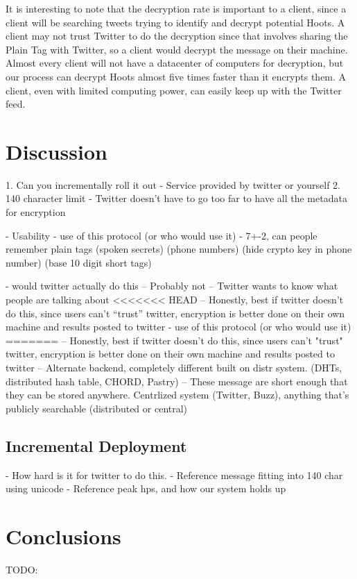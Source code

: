 \documentclass{acm_proc_article-sp}
\begin{document}
It is interesting to note that the decryption rate is important to a client, since a client will be searching tweets trying to identify and decrypt potential Hoots. A client may not trust Twitter to do the decryption since that involves sharing the Plain Tag with Twitter, so a client would decrypt the message on their machine. Almost every client will not have a datacenter of computers for decryption, but our  process can decrypt Hoots almost five times faster than it encrypts them. A client, even with limited computing power, can easily keep up with the Twitter feed.

\section{Discussion}
1. Can you incrementally roll it out
	- Service provided by twitter or yourself
2. 140 character limit
	- Twitter doesn't have to go too far to have all the metadata for encryption



- Usability
	- use of this protocol (or who would use it)
	- 7+-2, can people remember plain tags (spoken secrets) (phone numbers) (hide crypto key in phone number) (base 10 digit short tags)
	
- would twitter actually do this
	-- Probably not
	-- Twitter wants to know what people are talking about
<<<<<<< HEAD
	-- Honestly, best if twitter doesn't do this, since users can't ``trust'' twitter, encryption is better done on their own machine and results posted to twitter
- use of this protocol (or who would use it)
=======
	-- Honestly, best if twitter doesn't do this, since users can't "trust" twitter, encryption is better done on their own machine and results posted to twitter
		-- Alternate backend, completely different built on distr system. (DHTs, distributed hash table, CHORD, Pastry)
		-- These message are short enough that they can be stored anywhere. Centrlized system (Twitter, Buzz), anything that's publicly searchable (distributed or central)
		
\subsection{Incremental Deployment}

- How hard is it for twitter to do this. 
- Reference message fitting into 140 char using unicode
- Reference peak hps, and how our system holds up

\section{Conclusions}

TODO:




\balancecolumns{}
\end{document}
